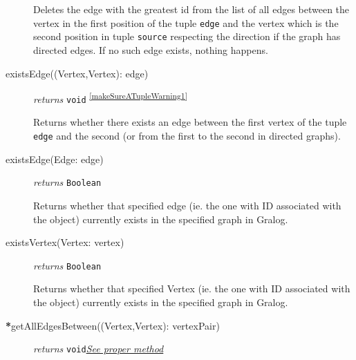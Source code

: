 \begin{description}
  Deletes the edge with the greatest id from the list of all edges
  between the vertex in the first position of the tuple \texttt{edge} and the vertex which is the second position in tuple \texttt{source} respecting
  the direction if the graph has directed edges. If no such edge exists, nothing happens.




\item[existsEdge((Vertex,Vertex): edge)] \emph{returns}
  \texttt{void} \textsuperscript{\ref{makeSureATupleWarning1}}

  Returns whether there exists an edge between the first vertex of the tuple \texttt{edge} and the second (or from the first to the second in directed graphs).
  
  
\item[existsEdge(Edge: edge)] \emph{returns}
  \texttt{Boolean}

  Returns whether that specified edge (ie. the one with ID associated with the object) currently exists in the specified graph in Gralog. 
  

  
\item[existsVertex(Vertex: vertex)] \emph{returns}
  \texttt{Boolean}

  Returns whether that specified Vertex (ie. the one with ID associated with the object) currently exists in the specified graph in Gralog. 
  



\item[\textbf{*}getAllEdgesBetween((Vertex,Vertex): vertexPair)] \emph{returns} \texttt{void}\quad \hyperref[getAllEdgesBetweenClass]{\textit{See proper method}}


\end{description}
